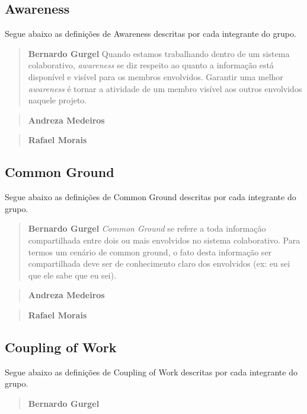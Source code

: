 \documentclass{acm_proc_article-sp}
\begin{document}
\subsection{Awareness}
Segue abaixo as definições de Awareness descritas por cada integrante do grupo.

\begin{quote}\textbf{Bernardo Gurgel}
Quando estamos trabalhando dentro de um sistema colaborativo, \textsl{awareness} se diz respeito ao quanto a informação está disponível e visível para os membros envolvidos. Garantir uma melhor \textsl{awareness} é tornar a atividade de um membro visível aos outros envolvidos naquele projeto.
\end{quote}

\begin{quote}\textbf{Andreza Medeiros}
\end{quote}

\begin{quote}\textbf{Rafael Morais}
\end{quote}

\subsection{Common Ground}
Segue abaixo as definições de Common Ground descritas por cada integrante do grupo.

\begin{quote}\textbf{Bernardo Gurgel}
\textsl{Common Ground} se refere a toda informação compartilhada entre dois ou mais envolvidos no sistema colaborativo. Para termos um cenário de common ground, o fato desta informação ser compartilhada deve ser de conhecimento claro dos envolvidos (ex: eu sei que ele sabe que eu sei).
\end{quote}

\begin{quote}\textbf{Andreza Medeiros}
\end{quote}

\begin{quote}\textbf{Rafael Morais}
\end{quote}

\subsection{Coupling of Work}
Segue abaixo as definições de Coupling of Work descritas por cada integrante do grupo.

\begin{quote}\textbf{Bernardo Gurgel}
\end{quote}
\end{document}
